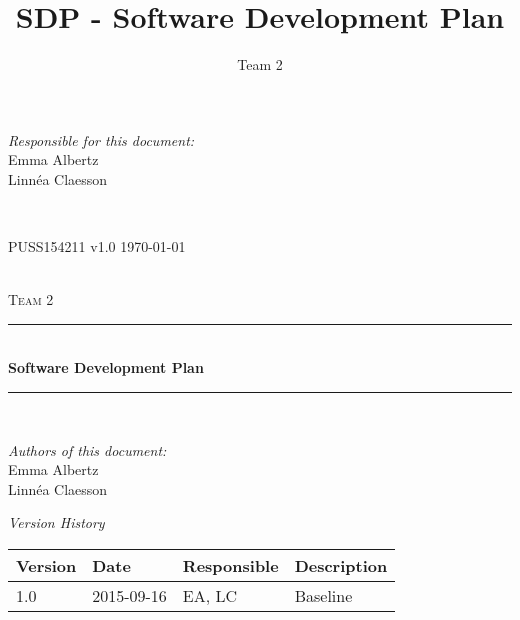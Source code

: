 \documentclass[a4paper]{article}
\title{SDP - Software Development Plan}
\author{Team 2}
\begin{document}
\begin{titlepage}
\newcommand{\HRule}{\rule{\linewidth}{0.5mm}}

\begin{minipage}{0.5\textwidth}
\begin{flushleft} %
\textit{Responsible for this document:}\\
Emma Albertz \\
Linnéa Claesson
\end{flushleft}
\end{minipage}
~
\begin{minipage}{0.4\textwidth}
\begin{flushright}
PUSS154211 v1.0 
\today
\end{flushright}
\end{minipage}\\[3cm]

\centering
\textsc{\LARGE Team 2}\\[0.5cm]

\HRule \\[0.4cm]
{ \huge \bfseries Software Development Plan}\\[0.4cm] %
\HRule \\[1.5cm]

\vfill
\begin{flushleft}
\textit{Authors of this document:}\\
Emma Albertz \\
Linnéa Claesson
\end{flushleft}



\end{titlepage}



\begin{center}
\textit{\large Version History}

    \begin{tabular}{ | l | l | l | p{5cm} |}
    \hline
    \textbf{Version} & \textbf{Date} & \textbf{Responsible} & \textbf{Description} \\ \hline
    1.0 & 2015-09-16 & EA, LC & Baseline\\ \hline
    \end{tabular}
\end{center}



\setcounter{tocdepth}{2}
\tableofcontents
\newpage
{}
\end{document}
